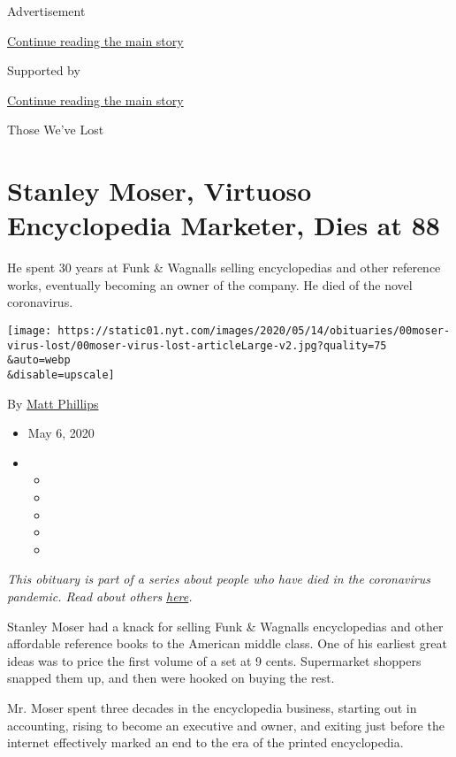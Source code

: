 Advertisement

\protect\hyperlink{after-top}{Continue reading the main story}

Supported by

\protect\hyperlink{after-sponsor}{Continue reading the main story}

Those We've Lost

\hypertarget{stanley-moser-virtuoso-encyclopedia-marketer-dies-at-88}{%
\section{Stanley Moser, Virtuoso Encyclopedia Marketer, Dies at
88}\label{stanley-moser-virtuoso-encyclopedia-marketer-dies-at-88}}

He spent 30 years at Funk \& Wagnalls selling encyclopedias and other
reference works, eventually becoming an owner of the company. He died of
the novel coronavirus.

\texttt{[image: https://static01.nyt.com/images/2020/05/14/obituaries/00moser-virus-lost/00moser-virus-lost-articleLarge-v2.jpg?quality=75\\\&auto=webp\\\&disable=upscale]}

By \href{https://www.nytimes.com/by/matt-phillips}{Matt Phillips}

\begin{itemize}
\item
  May 6, 2020
\item
  \begin{itemize}
  \item
  \item
  \item
  \item
  \item
  \end{itemize}
\end{itemize}

\emph{This obituary is part of a series about people who have died in
the coronavirus pandemic. Read about others}
\href{https://www.nytimes.com/series/people-who-have-died-of-the-coronavirus}{\emph{here}}\emph{.}

Stanley Moser had a knack for selling Funk \& Wagnalls encyclopedias and
other affordable reference books to the American middle class. One of
his earliest great ideas was to price the first volume of a set at 9
cents. Supermarket shoppers snapped them up, and then were hooked on
buying the rest.

Mr. Moser spent three decades in the encyclopedia business, starting out
in accounting, rising to become an executive and owner, and exiting just
before the internet effectively marked an end to the era of the printed
encyclopedia.

